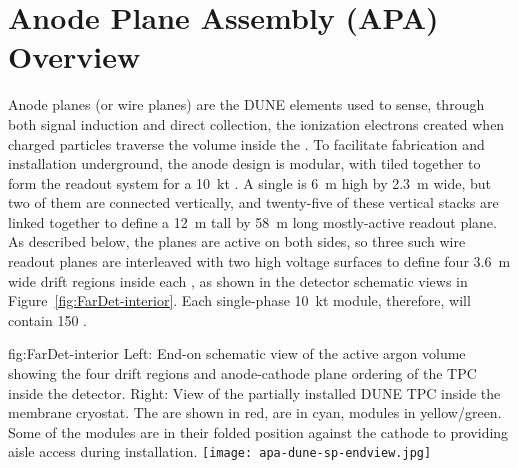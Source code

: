 \section{Anode Plane Assembly (APA) Overview}
\label{sec:fdsp-apa-intro}

Anode planes (or wire planes) are the DUNE  elements used to sense, through both signal induction and direct collection, the ionization electrons created when charged particles traverse the \lar volume inside the . To facilitate fabrication and installation underground, the anode design is modular, with  tiled together to form the readout system for a \SI{10}{kt} . A single  is \SI{6}{m} high by \SI{2.3}{m} wide, but two of them are connected vertically, and twenty-five of these vertical stacks are linked together to define a \SI{12}{m} tall by \SI{58}{m} long mostly-active readout plane.  As described below, the planes are active on both sides, so three such wire readout planes are interleaved with two high voltage surfaces to define four \SI{3.6}{m} wide drift regions inside each , as shown in the detector schematic views in Figure~\ref{fig:FarDet-interior}.  Each single-phase \SI{10}{kt} module, therefore, will contain 150 .

\begin{dunefigure}{fig:FarDet-interior}
{Left: End-on schematic view of the active argon volume showing the four drift regions and anode-cathode plane ordering of the TPC inside the detector. Right: View of the partially installed DUNE TPC inside the membrane cryostat. The  are shown in red,  are in cyan,  modules in yellow/green.  Some of the  modules are in their folded position against the cathode to providing aisle access during installation.}
\setlength{\fboxsep}{0pt}
\setlength{\fboxrule}{0.5pt}
\texttt{[image: apa-dune-sp-endview.jpg]}\hspace{0.01\textwidth}
\end{dunefigure}

